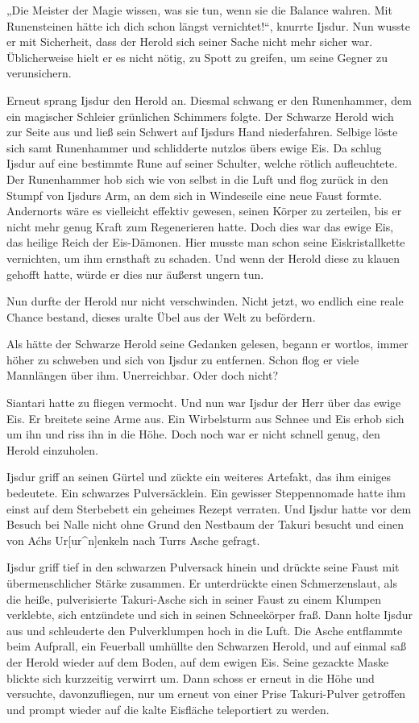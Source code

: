 „Die Meister der Magie wissen, was sie tun, wenn sie die Balance wahren. Mit Runensteinen hätte ich dich schon längst vernichtet!“, knurrte Ijsdur. Nun wusste er mit Sicherheit, dass der Herold sich seiner Sache nicht mehr sicher war. Üblicherweise hielt er es nicht nötig, zu Spott zu greifen, um seine Gegner zu verunsichern.

Erneut sprang Ijsdur den Herold an. Diesmal schwang er den Runenhammer, dem ein magischer Schleier grünlichen Schimmers folgte. Der Schwarze Herold wich zur Seite aus und ließ sein Schwert auf Ijsdurs Hand niederfahren. Selbige löste sich samt Runenhammer und schlidderte nutzlos übers ewige Eis. Da schlug Ijsdur auf eine bestimmte Rune auf seiner Schulter, welche rötlich aufleuchtete. Der Runenhammer hob sich wie von selbst in die Luft und flog zurück in den Stumpf von Ijsdurs Arm, an dem sich in Windeseile eine neue Faust formte. Andernorts wäre es vielleicht effektiv gewesen, seinen Körper zu zerteilen, bis er nicht mehr genug Kraft zum Regenerieren hatte. Doch dies war das ewige Eis, das heilige Reich der Eis-Dämonen. Hier musste man schon seine Eiskristallkette vernichten, um ihm ernsthaft zu schaden. Und wenn der Herold diese zu klauen gehofft hatte, würde er dies nur äußerst ungern tun.

Nun durfte der Herold nur nicht verschwinden. Nicht jetzt, wo endlich eine reale Chance bestand, dieses uralte Übel aus der Welt zu befördern.

Als hätte der Schwarze Herold seine Gedanken gelesen, begann er wortlos, immer höher zu schweben und sich von Ijsdur zu entfernen. Schon flog er viele Mannlängen über ihm. Unerreichbar. Oder doch nicht?

Siantari hatte zu fliegen vermocht. Und nun war Ijsdur der Herr über das ewige Eis. Er breitete seine Arme aus. Ein Wirbelsturm aus Schnee und Eis erhob sich um ihn und riss ihn in die Höhe. Doch noch war er nicht schnell genug, den Herold einzuholen.

Ijsdur griff an seinen Gürtel und zückte ein weiteres Artefakt, das ihm einiges bedeutete. Ein schwarzes Pulversäcklein. Ein gewisser Steppennomade hatte ihm einst auf dem Sterbebett ein geheimes Rezept verraten. Und Ijsdur hatte vor dem Besuch bei Nalle nicht ohne Grund den Nestbaum der Takuri besucht und einen von Aćhs Ur[ur\^{}n]enkeln nach Turrs Asche gefragt.

Ijsdur griff tief in den schwarzen Pulversack hinein und drückte seine Faust mit übermenschlicher Stärke zusammen. Er unterdrückte einen Schmerzenslaut, als die heiße, pulverisierte Takuri-Asche sich in seiner Faust zu einem Klumpen verklebte, sich entzündete und sich in seinen Schneekörper fraß. Dann holte Ijsdur aus und schleuderte den Pulverklumpen hoch in die Luft. Die Asche entflammte beim Aufprall, ein Feuerball umhüllte den Schwarzen Herold, und auf einmal saß der Herold wieder auf dem Boden, auf dem ewigen Eis. Seine gezackte Maske blickte sich kurzzeitig verwirrt um. Dann schoss er erneut in die Höhe und versuchte, davonzufliegen, nur um erneut von einer Prise Takuri-Pulver getroffen und prompt wieder auf die kalte Eisfläche teleportiert zu werden.

